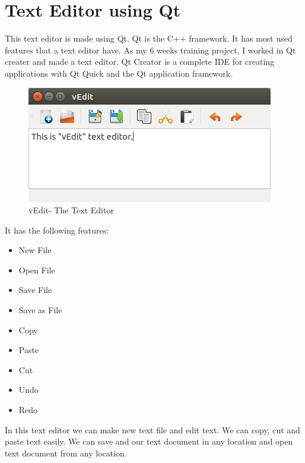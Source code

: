 \section{Text Editor using Qt}
This text editor is made using Qt. Qt is the C++ framework. It has most used features that a text editor have. As my 6 weeks training project,  I worked  in Qt creater and made a text editor.
Qt Creator is a complete IDE for creating applications with Qt Quick and the Qt application framework.
\begin{figure}[h]
\begin{center}
\includegraphics[scale=0.7]{images/vedit.png}
\caption{vEdit- The Text Editor}
\end{center}
\end{figure}

It has the following features:
\begin{itemize}
\item New File
\item Open File
\item Save File
\item Save as File
\item Copy
\item Paste
\item Cut
\item Undo
\item Redo
\end{itemize}

In this text editor we can make new text file and edit text. We can copy, cut and paste text easily. We can save and our text document in any location and open text document from any location. 

